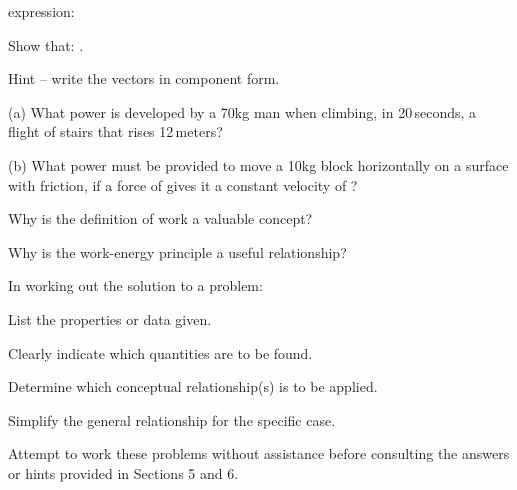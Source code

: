 {\begin{one-digit-list}
           expression:
\item [q.] Show that: .
\item []   Hint -- write the vectors in component form.
\item [r.] (a) What power is developed by a 70\unit{kg} man when climbing, in 20\,\unit{seconds},
               a flight of stairs that rises 12\,\unit{meters}?
\item []   (b) What power must be provided to move a 10\unit{kg} block
           horizontally on a surface with friction, if a force of
            gives it a constant velocity of
           ? 
\item [s.] Why is the definition of work a valuable concept? 
\item [t.] Why is the work-energy principle a useful relationship? 
\end{one-digit-list}


\noindent In working out the solution to a problem:

\begin{one-digit-list}
\item [a.] List the properties or data given.
\item [b.] Clearly indicate which quantities are to be found.
\item [c.] Determine which conceptual relationship(s) is to be applied.
\item [d.] Simplify the general relationship for the specific case.
\end{one-digit-list}

\noindent Attempt to work these problems without assistance before consulting
the answers or hints provided in Sections 5 and 6.

\begin{one-digit-list}
\item [1.] 


\end{one-digit-list}}
